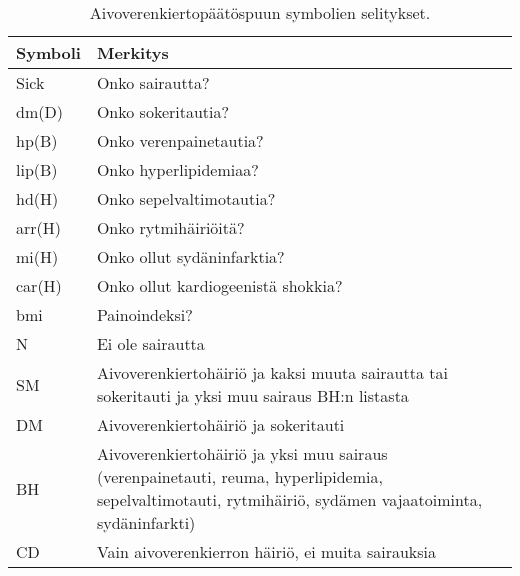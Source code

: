 \documentclass[12pt,finnish]{tktltiki2}
\theoremstyle{definition}
\theoremstyle{remark}
\begin{document}
\begin{table}
\centering
    \begin{tabular}{ | l | p{5cm} |} \hline
    \textbf{Symboli} & \textbf{Merkitys} \\ \hline
    Sick & Onko sairautta? \\ \hline
    dm(D) & Onko sokeritautia? \\ \hline
    hp(B) & Onko verenpainetautia? \\ \hline
    lip(B) & Onko hyperlipidemiaa? \\ \hline
    hd(H) & Onko sepelvaltimotautia? \\ \hline
    arr(H) & Onko rytmihäiriöitä? \\ \hline
    mi(H) & Onko ollut sydäninfarktia? \\ \hline
    car(H) & Onko ollut kardiogeenistä shokkia? \\ \hline
    bmi & Painoindeksi? \\ \hline
    N & Ei ole sairautta \\ \hline
    SM & Aivoverenkiertohäiriö ja kaksi muuta sairautta tai sokeritauti ja yksi muu sairaus BH:n listasta \\ \hline
    DM & Aivoverenkiertohäiriö ja sokeritauti \\ \hline
    BH & Aivoverenkiertohäiriö ja yksi muu sairaus (verenpainetauti, reuma, hyperlipidemia, sepelvaltimotauti, rytmihäiriö, sydämen vajaatoiminta, sydäninfarkti) \\ \hline
    CD & Vain aivoverenkierron häiriö, ei muita sairauksia \\ \hline
    \end{tabular}
\caption{Aivoverenkiertopäätöspuun symbolien selitykset.}
\label{table:AVHpäätöspuuSelitteet}
\end{table}
\end{document}
